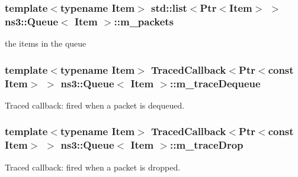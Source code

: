 \subsubsection[{\texorpdfstring{m\+\_\+packets}{m_packets}}]{\setlength{\rightskip}{0pt plus 5cm}template$<$typename Item$>$ {\bf std\+::list}$<${\bf Ptr}$<$Item$>$ $>$ {\bf ns3\+::\+Queue}$<$ Item $>$\+::m\+\_\+packets\hspace{0.3cm}{\ttfamily [private]}}\hypertarget{classns3_1_1Queue_a7566add06f61f79cc571ee4822a8bd69}{}\label{classns3_1_1Queue_a7566add06f61f79cc571ee4822a8bd69}


the items in the queue 

\subsubsection[{\texorpdfstring{m\+\_\+trace\+Dequeue}{m_traceDequeue}}]{\setlength{\rightskip}{0pt plus 5cm}template$<$typename Item$>$ {\bf Traced\+Callback}$<${\bf Ptr}$<$const Item$>$ $>$ {\bf ns3\+::\+Queue}$<$ Item $>$\+::m\+\_\+trace\+Dequeue\hspace{0.3cm}{\ttfamily [private]}}\hypertarget{classns3_1_1Queue_acba7318200df563f801b26677163df6e}{}\label{classns3_1_1Queue_acba7318200df563f801b26677163df6e}


Traced callback\+: fired when a packet is dequeued. 

\subsubsection[{\texorpdfstring{m\+\_\+trace\+Drop}{m_traceDrop}}]{\setlength{\rightskip}{0pt plus 5cm}template$<$typename Item$>$ {\bf Traced\+Callback}$<${\bf Ptr}$<$const Item$>$ $>$ {\bf ns3\+::\+Queue}$<$ Item $>$\+::m\+\_\+trace\+Drop\hspace{0.3cm}{\ttfamily [private]}}\hypertarget{classns3_1_1Queue_adf7eee762113de3df7f4b6a7128b036c}{}\label{classns3_1_1Queue_adf7eee762113de3df7f4b6a7128b036c}


Traced callback\+: fired when a packet is dropped. 

